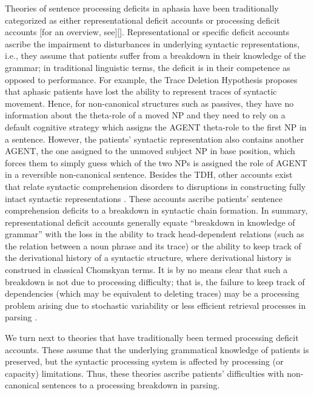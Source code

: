 \documentclass{cambridge7A}\usepackage[]{graphicx}\usepackage[]{color}
\begin{document}
Theories of sentence processing deficits in aphasia have been traditionally categorized as either representational deficit accounts or processing deficit accounts [for an overview, see][]\citep{Caplan:2009}.
Representational or specific deficit accounts ascribe the impairment to disturbances in underlying syntactic representations, i.e., they assume that patients suffer from a breakdown in their knowledge of the grammar; in traditional linguistic terms, the deficit is in their competence as opposed to performance. 
For example, the Trace Deletion Hypothesis \citep[TDH,][]{Grodzinsky:1995,Grodzinsky:2000,Grodzinsky:2006a} proposes that aphasic patients have lost the ability to represent traces of syntactic movement. Hence, for non-canonical structures such as passives, they have no information about the theta-role of a moved NP and they need to rely on a default cognitive strategy which assigns the AGENT theta-role to the first NP in a sentence. However, the patients' syntactic representation also contains another AGENT, the one assigned to the unmoved subject NP in base position, which forces them to simply guess which of the two NPs is assigned the role of AGENT in a reversible non-canonical sentence.
Besides the TDH, other accounts exist that relate syntactic comprehension disorders to disruptions in constructing fully intact syntactic representations \citep[for example,][]{Beretta:1998,Hickok:1995,Mauner:1993}. These accounts ascribe patients' sentence comprehension deficits to a breakdown in syntactic chain formation. 
In summary, representational deficit accounts generally equate ``breakdown in knowledge of grammar'' with the loss in the ability to track head-dependent relations (such as the relation between a noun phrase and its trace) or the ability to keep track of the derivational history of a syntactic structure, where derivational history is construed in classical Chomskyan terms. It is by no means clear that such a breakdown is not due to processing difficulty; that is, the failure to keep track of dependencies (which may be equivalent to deleting traces) may be a processing problem arising due to stochastic variability or less efficient retrieval processes in parsing \cite{EngelmannVasishthCUNY2014}.

We turn next to theories that have traditionally been termed processing deficit accounts. These assume that the underlying grammatical knowledge of patients is preserved, but the syntactic processing system is affected by processing (or capacity) limitations. Thus, these theories ascribe patients' difficulties with non-canonical sentences to a processing breakdown in parsing. 
\end{document}
